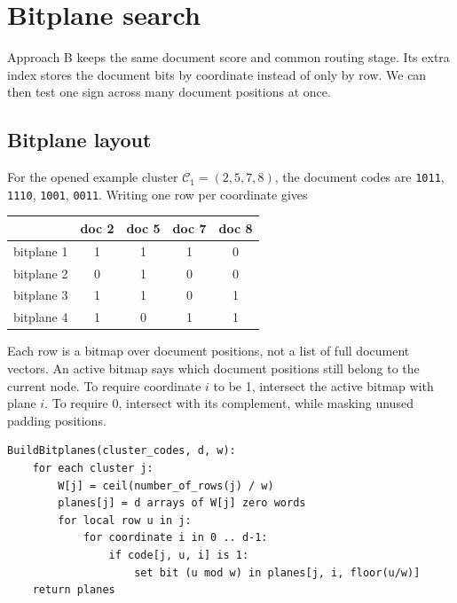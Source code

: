 \section{Bitplane search}
\label{sec:bitplanes}
Approach B keeps the same document score and common routing stage. Its extra index stores
the document bits by coordinate instead of only by row. We can then test one sign
across many document positions at once.


\subsection{Bitplane layout}
For the opened example cluster $\mathcal C_1=(2,5,7,8)$, the document codes are
\texttt{1011}, \texttt{1110}, \texttt{1001}, \texttt{0011}. Writing one row per coordinate gives
\begin{center}
\begin{tabular}{@{}lcccc@{}}\toprule
 & doc 2 & doc 5 & doc 7 & doc 8\\\midrule
bitplane 1 & 1&1&1&0\\
bitplane 2 & 0&1&0&0\\
bitplane 3 & 1&1&0&1\\
bitplane 4 & 1&0&1&1\\\bottomrule
\end{tabular}
\end{center}
Each row is a bitmap over document positions, not a list of full document vectors. An active
bitmap says which document positions still belong to the current node. To require coordinate
$i$ to be 1, intersect the active bitmap with plane $i$. To require 0, intersect with its
complement, while masking unused padding positions.

\par\noindent\begin{minipage}{\linewidth}
\begin{lstlisting}[caption={Build the additional bitplane index.}]
BuildBitplanes(cluster_codes, d, w):
    for each cluster j:
        W[j] = ceil(number_of_rows(j) / w)
        planes[j] = d arrays of W[j] zero words
        for local row u in j:
            for coordinate i in 0 .. d-1:
                if code[j, u, i] is 1:
                    set bit (u mod w) in planes[j, i, floor(u/w)]
    return planes
\end{lstlisting}
\end{minipage}\par

